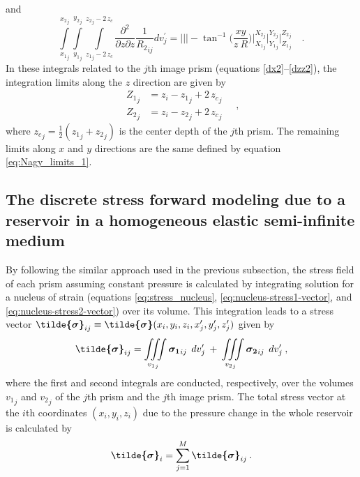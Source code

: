 \documentclass[journal abbreviation, manuscript]{copernicus}
\begin{document}
and
\begin{equation}
\int\limits_{{x_{1}}_{j}}^{{x_{2}}_{j}} \int\limits_{{y_{1}}_{j}}^{{y_{2}}_{j}} \int\limits_{{z_{1}}_{j} - 2 \, z_c}^{{z_{2}}_{j} - 2 \, z_c}
\frac{\partial^{2}  }{\partial z \partial z} {\frac{1}{{R_2}_{ij}}} dv_{j}^{\prime} =
\Bigg|\Bigg|\Bigg|
-   \tan^{-1} \Bigg( \frac{xy}{z \: R} \Bigg)
\Bigg|_{{X_1}_{j}}^{{X_2}_{j}} \Bigg|_{{Y_1}_{j}}^{{Y_2}_{j}} \Bigg|_{{Z_1}_{j}}^{{Z_2}_{j}} \quad .
\label{dzz2}
\end{equation}
In these integrals related to the $j$th image prism 
(equations \ref{dx2}--\ref{dzz2}), the integration limits along the $z$ direction
are given by
\begin{equation}
\begin{array}{ll}
{Z_1}_{j} &= z_i - {z_1}_{j} + 2 \, {z_c}_{j} \\
{Z_2}_{j} &= z_i - {z_2}_{j} + 2 \, {z_c}_{j}
\end{array} \quad ,
\label{eq:Nagy_limits_2}
\end{equation}
where ${z_c}_{j} = \frac{1}{2}({z_1}_{j} + {z_2}_{j})$ is the center depth of the $j$th prism. 
The remaining limits along $x$ and $y$ directions are the same defined by equation 
\ref{eq:Nagy_limits_1}.


\subsection{The discrete stress forward modeling due to a reservoir in a homogeneous elastic semi-infinite medium}

By following the similar approach used in the previous subsection, the stress field of each prism assuming constant pressure is calculated by integrating solution for a 
nucleus of strain (equations \ref{eq:stress_nucleus}, \ref{eq:nucleus-stress1-vector},
and \ref{eq:nucleus-stress2-vector}) over its volume. 
This integration leads to a stress vector 
$\mbox{\boldmath$\tilde{\sigma}$}_{ij} \equiv \mbox{\boldmath$\tilde{\sigma}$}(x_{i}, y_{i}, z_{i}, x^{\prime}_{j}, y^{\prime}_{j}, z^{\prime}_{j})$ given by
\begin{equation}
\mbox{\boldmath$\tilde{\sigma}$}_{ij} = 
\iiint\limits_{{v_{1}}_{j}}
\mbox{\boldmath$\sigma_{1}$}_{ij} \: \:  dv_{j}^{\prime}
\: + \:
\iiint\limits_{{v_{2}}_{j}}
\mbox{\boldmath$\sigma_{2}$}_{ij} \:\:  dv_{j}^{\prime} \: ,
\label{eq:nucleus-stress_jth_prism}
\end{equation}
where the first and second integrals are conducted, respectively, over the volumes 
${v_{1}}_{j}$ and ${v_{2}}_{j}$ of the $j$th prism and the $j$th image prism.
The total stress vector at the $i$th coordinates  $(x_i, y_i, z_i)$ due to the 
pressure change in the whole reservoir is calculated by 
\begin{equation}
\mbox{\boldmath$\tilde{\sigma}$}_{i} = 
\sum_{j=1}^{M} \mbox{\boldmath$\tilde{\sigma}$}_{ij} \: .
\label{eq:nucleus-stress_M_prisms}
\end{equation}
\end{document}
